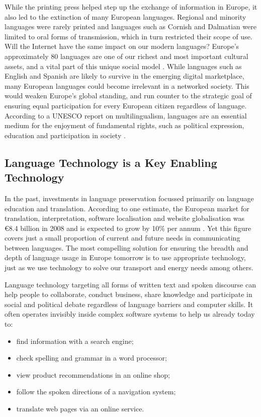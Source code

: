 \begin{multicols}{2}
While the printing press helped step up the exchange of information in Europe, it also led to the extinction of many European languages. Regional and minority languages were rarely printed and languages such as Cornish and Dalmatian were limited to oral forms of transmission, which in turn restricted their scope of use. Will the Internet have the same impact on our modern languages?
Europe’s approximately 80 languages are one of our richest and most important cultural assets, and a vital part of this unique social model \cite{EC2}. While languages such as English and Spanish are likely to survive in the emerging digital marketplace, many European languages could become irrelevant in a networked society. This would weaken Europe’s global standing, and run counter to the strategic goal of ensuring equal participation for every European citizen regardless of language.
According to a UNESCO report on multilingualism, languages are an essential medium for the enjoyment of fundamental rights, such as political expression, education and participation in society \cite{Unesco1}.

\subsection{Language Technology is a Key Enabling Technology}

In the past, investments in language preservation focussed primarily on language education and translation. According to one estimate, the European market for translation, interpretation, software localisation and website globalisation was €8.4 billion in 2008 and is expected to grow by 10\% per annum \cite{EC3}. Yet this figure covers just a small proportion of current and future needs in communicating between languages. The most compelling solution for ensuring the breadth and depth of language usage in Europe tomorrow is to use appropriate technology, just as we use technology to solve our transport and energy needs among others.

Language technology targeting all forms of written text and spoken discourse can help people to collaborate, conduct business, share knowledge and participate in social and political debate regardless of language barriers and computer skills. It often operates invisibly inside complex software systems to help us already today to:

\begin{itemize}
\item find information with a search engine;
\item check spelling and grammar in a word processor;
\item view product recommendations in an online shop;
\item follow the spoken directions of a navigation system;
\item translate web pages via an online service.
\end{itemize}


\end{multicols}
